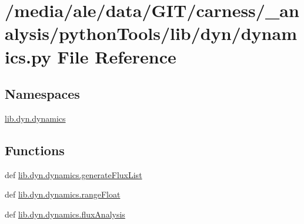 \hypertarget{a00052}{\section{/media/ale/data/\-G\-I\-T/carness/\-\_\-analysis/python\-Tools/lib/dyn/dynamics.py File Reference}
\label{a00052}
}
\subsection*{Namespaces}
\begin{DoxyCompactItemize}
\item 
\hyperlink{a00107}{lib.\-dyn.\-dynamics}
\end{DoxyCompactItemize}
\subsection*{Functions}
\begin{DoxyCompactItemize}
\item 
def \hyperlink{a00107_a5c7482c3127ef70514cbc82ce1aa9f47}{lib.\-dyn.\-dynamics.\-generate\-Flux\-List}
\item 
def \hyperlink{a00107_acbc0de876640b8d5355bf6a0e4fdef4a}{lib.\-dyn.\-dynamics.\-range\-Float}
\item 
def \hyperlink{a00107_ac3232f52dce6e169a93eba81f8fb926e}{lib.\-dyn.\-dynamics.\-flux\-Analysis}
\end{DoxyCompactItemize}
